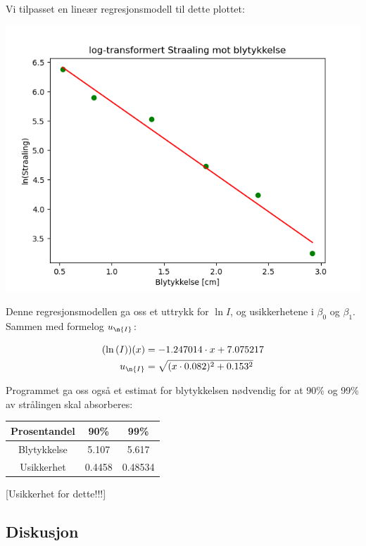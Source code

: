 Vi tilpasset en lineær regresjonsmodell til dette plottet:

\begin{center}
\includegraphics[scale=0.7]{Figurer/LogStraaling_Regresjon.png}
\end{center}

Denne regresjonsmodellen ga oss et uttrykk for  $\ln{I}$, og usikkerhetene i $\beta_0$ og $\beta_1$. Sammen med formelog $u_{\n{I}}$:

\begin{align*}
    (\ln{(I)})(x) &= -1.247014\cdot x + 7.075217\\
    u_{\n{I}} &= \sqrt{(x\cdot 0.082)^2 + 0.153^2}
\end{align*}

Programmet ga oss også et estimat for blytykkelsen nødvendig for at 90\% og 99\% av strålingen skal absorberes:

\begin{center}
\begin{tabular}{ | c | c | c | }
    \hline
    Prosentandel & 90\% & 99\%\\ 
    \hline
    Blytykkelse & 5.107 & 5.617\\ 
    \hline
    Usikkerhet & 0.4458 & 0.48534\\ 
    \hline
\end{tabular}
\end{center}

[Usikkerhet for dette!!!]

\subsection{Diskusjon}

